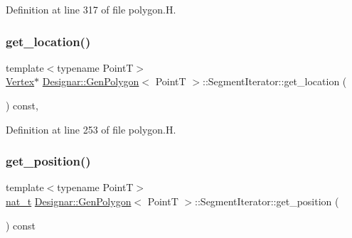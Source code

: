 Definition at line 317 of file polygon.\+H.

\mbox{\label{class_designar_1_1_gen_polygon_1_1_segment_iterator_aa9bf75b7e9feef819ad97f7acd152fe6}} 
\subsubsection{\texorpdfstring{get\+\_\+location()}{get\_location()}}
{\footnotesize\ttfamily template$<$typename PointT$>$ \\
\hyperlink{class_designar_1_1_d_l_node}{Vertex}$\ast$ \hyperlink{class_designar_1_1_gen_polygon}{Designar\+::\+Gen\+Polygon}$<$ PointT $>$\+::Segment\+Iterator\+::get\+\_\+location (\begin{DoxyParamCaption}{ }\end{DoxyParamCaption}) const\hspace{0.3cm}{\ttfamily [inline]}, {\ttfamily [protected]}}



Definition at line 253 of file polygon.\+H.

\mbox{\label{class_designar_1_1_gen_polygon_1_1_segment_iterator_abb850f5034a93dd4da93de11c5619de5}} 
\subsubsection{\texorpdfstring{get\+\_\+position()}{get\_position()}}
{\footnotesize\ttfamily template$<$typename PointT$>$ \\
\hyperlink{namespace_designar_aa72662848b9f4815e7bf31a7cf3e33d1}{nat\+\_\+t} \hyperlink{class_designar_1_1_gen_polygon}{Designar\+::\+Gen\+Polygon}$<$ PointT $>$\+::Segment\+Iterator\+::get\+\_\+position (\begin{DoxyParamCaption}{ }\end{DoxyParamCaption}) const\hspace{0.3cm}{\ttfamily [inline]}}



